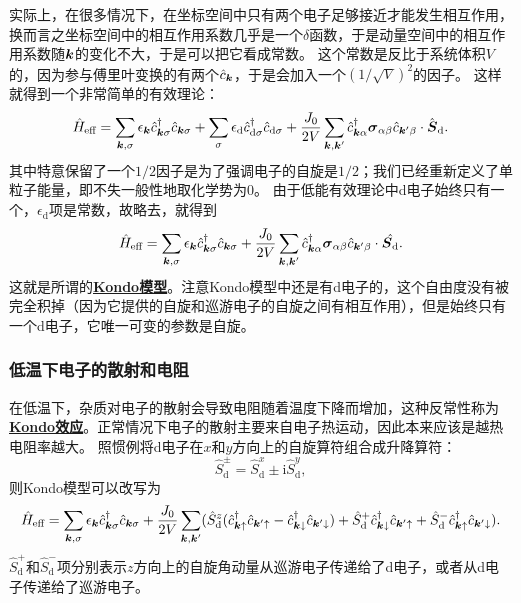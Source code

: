 \documentclass[hyperref, UTF8, a4paper]{ctexart}
\newcommand*{\ii}{\mathrm{i}}
\newcommand*{\concept}[1]{\underline{\textbf{#1}}}
\begin{document}
实际上，在很多情况下，在坐标空间中只有两个电子足够接近才能发生相互作用，换而言之坐标空间中的相互作用系数几乎是一个$\delta$函数，于是动量空间中的相互作用系数随$\vb*{k}$的变化不大，于是可以把它看成常数。
这个常数是反比于系统体积$V$的，因为参与傅里叶变换的有两个$\hat{c}_{\vb*{k}}$，于是会加入一个$(1/\sqrt{V})^2$的因子。
这样就得到一个非常简单的有效理论：
\[
    \hat{H}_\text{eff} = \sum_{\vb*{k}, \sigma} \epsilon_{\vb*{k}} \hat{c}_{\vb*{k}\sigma}^\dagger \hat{c}_{\vb*{k} \sigma} + \sum_\sigma \epsilon_\text{d} \hat{c}_{\text{d}\sigma}^\dagger \hat{c}_{\text{d} \sigma} + \frac{J_0}{2V} \sum_{\vb*{k}, \vb*{k}'} \hat{c}^\dagger_{\vb*{k} \alpha} \vb*{\sigma}_{\alpha \beta} \hat{c}_{\vb*{k}' \beta} \cdot \hat{\vb*{S}}_\text{d}.
\]
其中特意保留了一个$1/2$因子是为了强调电子的自旋是$1/2$；我们已经重新定义了单粒子能量，即不失一般性地取化学势为$0$。%
由于低能有效理论中d电子始终只有一个，$\epsilon_\text{d}$项是常数，故略去，就得到
\begin{equation}
    \hat{H}_\text{eff} = \sum_{\vb*{k}, \sigma} \epsilon_{\vb*{k}} \hat{c}_{\vb*{k}\sigma}^\dagger \hat{c}_{\vb*{k} \sigma} + \frac{J_0}{2V} \sum_{\vb*{k}, \vb*{k}'} \hat{c}^\dagger_{\vb*{k} \alpha} \vb*{\sigma}_{\alpha \beta} \hat{c}_{\vb*{k}' \beta} \cdot \hat{\vb*{S}_\text{d}}.
\end{equation}
这就是所谓的\concept{Kondo模型}。注意Kondo模型中还是有d电子的，这个自由度没有被完全积掉（因为它提供的自旋和巡游电子的自旋之间有相互作用），但是始终只有一个d电子，它唯一可变的参数是自旋。

\subsubsection{低温下电子的散射和电阻}

在低温下，杂质对电子的散射会导致电阻随着温度下降而增加，这种反常性称为\concept{Kondo效应}。正常情况下电子的散射主要来自电子热运动，因此本来应该是越热电阻率越大。
照惯例将d电子在$x$和$y$方向上的自旋算符组合成升降算符：
\begin{equation}
    \hat{S}_\text{d}^{\pm} = \hat{S}_\text{d}^x \pm \ii \hat{S}_\text{d}^y,
\end{equation}
则Kondo模型可以改写为
\begin{equation}
    \hat{H}_\text{eff} = \sum_{\vb*{k}, \sigma} \epsilon_{\vb*{k}} \hat{c}^\dagger_{\vb*{k} \sigma} \hat{c}_{\vb*{k} \sigma} + \frac{J_0}{2V} \sum_{\vb*{k}, \vb*{k}'} (
        \hat{S}_\text{d}^z (\hat{c}^\dagger_{\vb*{k} \uparrow} \hat{c}_{\vb*{k}' \uparrow} - \hat{c}^\dagger_{\vb*{k} \downarrow} \hat{c}_{\vb*{k}' \downarrow})
        + \hat{S}^+_\text{d} \hat{c}^\dagger_{\vb*{k} \downarrow} \hat{c}_{\vb*{k}' \uparrow}
        + \hat{S}^-_\text{d} \hat{c}^\dagger_{\vb*{k} \uparrow} \hat{c}_{\vb*{k}' \downarrow}
    ).
    \label{eq:kondo-spin-up-down}
\end{equation}
$\hat{S}^+_\text{d}$和$\hat{S}^-_\text{d}$项分别表示$z$方向上的自旋角动量从巡游电子传递给了d电子，或者从d电子传递给了巡游电子。
\end{document}
